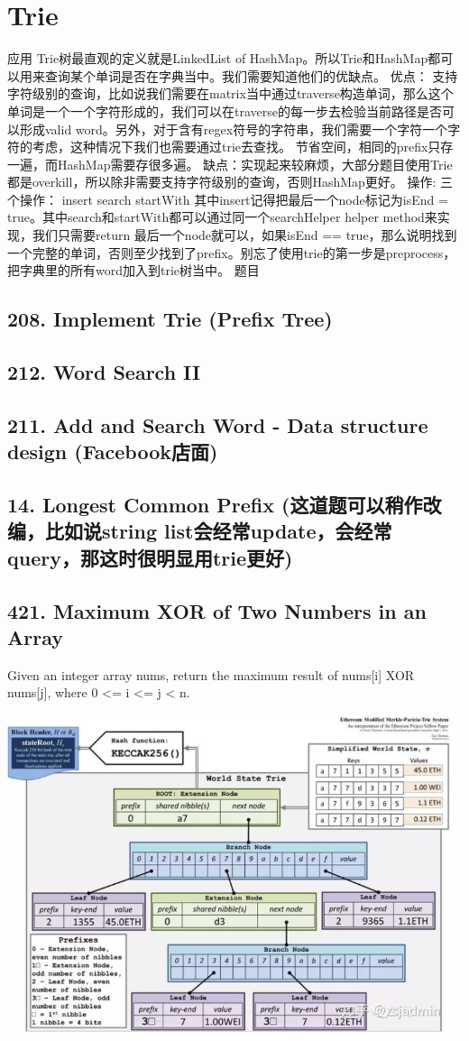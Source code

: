 \documentclass[9pt, b5paaper]{book}
\begin{document}
\chapter{Trie}
\label{sec-9}
应用
Trie树最直观的定义就是LinkedList of HashMap。所以Trie和HashMap都可以用来查询某个单词是否在字典当中。我们需要知道他们的优缺点。
优点：
支持字符级别的查询，比如说我们需要在matrix当中通过traverse构造单词，那么这个单词是一个一个字符形成的，我们可以在traverse的每一步去检验当前路径是否可以形成valid word。另外，对于含有regex符号的字符串，我们需要一个字符一个字符的考虑，这种情况下我们也需要通过trie去查找。
节省空间，相同的prefix只存一遍，而HashMap需要存很多遍。
缺点：实现起来较麻烦，大部分题目使用Trie都是overkill，所以除非需要支持字符级别的查询，否则HashMap更好。
操作: 三个操作：
insert
search
startWith
其中insert记得把最后一个node标记为isEnd = true。其中search和startWith都可以通过同一个searchHelper helper method来实现，我们只需要return 最后一个node就可以，如果isEnd == true，那么说明找到一个完整的单词，否则至少找到了prefix。别忘了使用trie的第一步是preprocess，把字典里的所有word加入到trie树当中。
题目
\section{208. Implement Trie (Prefix Tree)}
\label{sec-9-1}
\section{212. Word Search II}
\label{sec-9-2}
\section{211. Add and Search Word - Data structure design (Facebook店面)}
\label{sec-9-3}
\section{14. Longest Common Prefix (这道题可以稍作改编，比如说string list会经常update，会经常query，那这时很明显用trie更好)}
\label{sec-9-4}
\section{421. Maximum XOR of Two Numbers in an Array}
\label{sec-9-5}
Given an integer array nums, return the maximum result of nums[i] XOR nums[j], where 0 <= i <= j < n.

\includegraphics[width=.9\linewidth]{./pic/numTrie.png}
\end{document}

